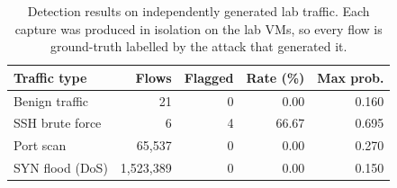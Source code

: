 \begin{table}[h]
\centering
\caption{Detection results on independently generated lab traffic. Each capture was produced in isolation on the lab VMs, so every flow is ground-truth labelled by the attack that generated it.}
\label{tab:per-attack-results}
\begin{tabular}{lrrrr}
\toprule
Traffic type & Flows & Flagged & Rate (\%) & Max prob. \\
\midrule
Benign traffic & 21 & 0 & 0.00 & 0.160 \\
SSH brute force & 6 & 4 & 66.67 & 0.695 \\
Port scan & 65,537 & 0 & 0.00 & 0.270 \\
SYN flood (DoS) & 1,523,389 & 0 & 0.00 & 0.150 \\
\bottomrule
\end{tabular}
\end{table}